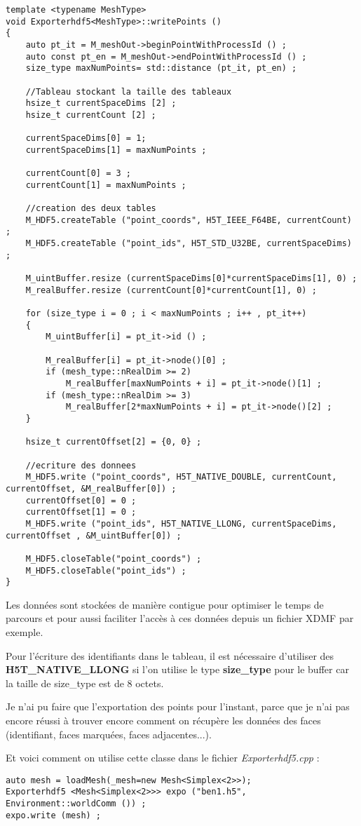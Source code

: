 \documentclass[12pt]{article}
\begin{document}
\begin{lstlisting}
template <typename MeshType>
void Exporterhdf5<MeshType>::writePoints () 
{
    auto pt_it = M_meshOut->beginPointWithProcessId () ;
    auto const pt_en = M_meshOut->endPointWithProcessId () ;
    size_type maxNumPoints= std::distance (pt_it, pt_en) ;

    //Tableau stockant la taille des tableaux
    hsize_t currentSpaceDims [2] ;
    hsize_t currentCount [2] ;

    currentSpaceDims[0] = 1;
    currentSpaceDims[1] = maxNumPoints ;

    currentCount[0] = 3 ;
    currentCount[1] = maxNumPoints ;

    //creation des deux tables
    M_HDF5.createTable ("point_coords", H5T_IEEE_F64BE, currentCount) ;
    M_HDF5.createTable ("point_ids", H5T_STD_U32BE, currentSpaceDims) ;

    M_uintBuffer.resize (currentSpaceDims[0]*currentSpaceDims[1], 0) ;
    M_realBuffer.resize (currentCount[0]*currentCount[1], 0) ;

    for (size_type i = 0 ; i < maxNumPoints ; i++ , pt_it++) 
    {
        M_uintBuffer[i] = pt_it->id () ;

        M_realBuffer[i] = pt_it->node()[0] ;
        if (mesh_type::nRealDim >= 2)
            M_realBuffer[maxNumPoints + i] = pt_it->node()[1] ;
        if (mesh_type::nRealDim >= 3)
            M_realBuffer[2*maxNumPoints + i] = pt_it->node()[2] ;
    }
    
    hsize_t currentOffset[2] = {0, 0} ;

    //ecriture des donnees
    M_HDF5.write ("point_coords", H5T_NATIVE_DOUBLE, currentCount, currentOffset, &M_realBuffer[0]) ;
    currentOffset[0] = 0 ;
    currentOffset[1] = 0 ;
    M_HDF5.write ("point_ids", H5T_NATIVE_LLONG, currentSpaceDims, currentOffset , &M_uintBuffer[0]) ;

    M_HDF5.closeTable("point_coords") ;
    M_HDF5.closeTable("point_ids") ;
}
\end{lstlisting}
Les données sont stockées de manière contigue pour optimiser le temps de parcours et pour aussi faciliter l'accès à ces données depuis un fichier XDMF par exemple.\newline

\noindent
Pour l'écriture des identifiants dans le tableau, il est nécessaire d'utiliser des \textbf{H5T\_NATIVE\_LLONG} si l'on utilise le type \textbf{size\_type} pour le buffer car la taille de size\_type est de 8 octets.\newline

\noindent
Je n'ai pu faire que l'exportation des points pour l'instant, parce que je n'ai pas encore réussi à trouver encore comment on récupère les données des faces (identifiant, faces marquées, faces adjacentes...). 

Et voici comment on utilise cette classe dans le fichier \emph {Exporterhdf5.cpp} :
\begin{lstlisting}
auto mesh = loadMesh(_mesh=new Mesh<Simplex<2>>);
Exporterhdf5 <Mesh<Simplex<2>>> expo ("ben1.h5", Environment::worldComm ()) ;
expo.write (mesh) ;
\end{lstlisting}
\end{document}
